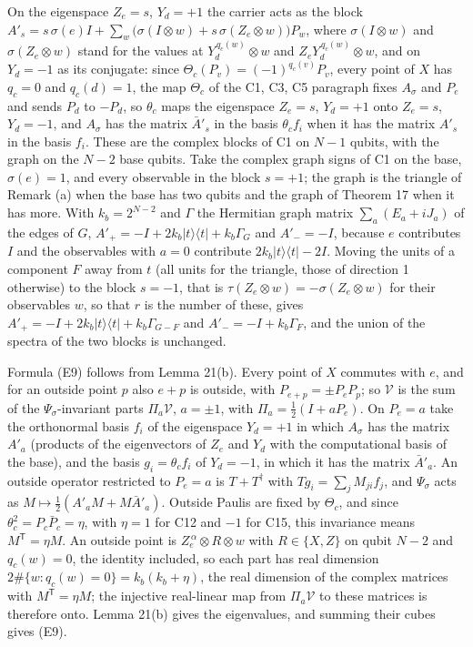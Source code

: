 \documentclass[11pt,a4paper]{article}
\begin{document}
On the eigenspace \(Z_e=s\), \(Y_d=+1\) the carrier acts as the block
\(A'_s=s\,\sigma(e)I+\sum_w\bigl(\sigma(I\otimes w)+s\,\sigma(Z_e\otimes w)\bigr)P_w\), where \(\sigma(I\otimes w)\) and
\(\sigma(Z_e\otimes w)\) stand for the values at \(Y_d^{\,q_c(w)}\otimes w\) and \(Z_eY_d^{\,q_c(w)}\otimes w\), and on
\(Y_d=-1\) as its conjugate: since \(\Theta_c(P_v)=(-1)^{q_c(v)}P_v\), every point of \(X\) has \(q_c=0\) and
\(q_c(d)=1\), the map \(\Theta_c\) of the C1, C3, C5 paragraph fixes \(A_\sigma\) and \(P_e\) and sends \(P_d\) to
\(-P_d\), so \(\theta_c\) maps the eigenspace
\(Z_e=s\), \(Y_d=+1\) onto \(Z_e=s\), \(Y_d=-1\), and \(A_\sigma\) has the matrix \(\bar A'_s\) in the basis \(\theta_cf_i\)
when it has the matrix \(A'_s\) in the basis \(f_i\). These are the complex blocks of C1 on \(N-1\) qubits,
with the graph on the \(N-2\) base qubits. Take the complex graph signs of C1 on the base,
\(\sigma(e)=1\), and every observable in the block \(s=+1\); the graph is the triangle of Remark (a) when the
base has two qubits and the graph of Theorem 17 when it has more. With \(k_b=2^{N-2}\) and \(\Gamma\) the
Hermitian graph matrix \(\sum_a(E_a+iJ_a)\) of the edges of \(G\),
\(A'_+=-I+2k_b|t\rangle\langle t|+k_b\Gamma_G\) and \(A'_-=-I\), because \(e\) contributes \(I\) and the observables
with \(a=0\) contribute \(2k_b|t\rangle\langle t|-2I\). Moving the units of a component \(F\) away from \(t\) (all
units for the triangle, those of direction 1 otherwise) to the block \(s=-1\), that is
\(\tau(Z_e\otimes w)=-\sigma(Z_e\otimes w)\) for their observables \(w\), so that \(r\) is the number of these,
gives \(A'_+=-I+2k_b|t\rangle\langle t|+k_b\Gamma_{G-F}\) and \(A'_-=-I+k_b\Gamma_F\), and the union of the
spectra of the two blocks is unchanged.

Formula (E9) follows from Lemma 21(b). Every point of \(X\) commutes with \(e\), and for an outside point
\(p\) also \(e+p\) is outside, with \(P_{e+p}=\pm P_eP_p\); so \(\mathcal V\) is the sum of the \(\Psi_\sigma\)-invariant
parts \(\Pi_a\mathcal V\), \(a=\pm1\), with \(\Pi_a=\frac12(I+aP_e)\). On \(P_e=a\) take the orthonormal basis \(f_i\) of
the eigenspace \(Y_d=+1\) in which \(A_\sigma\) has the matrix \(A'_a\) (products of the eigenvectors of \(Z_e\)
and \(Y_d\) with the computational basis of the base), and the basis \(g_i=\theta_cf_i\) of \(Y_d=-1\), in which
it has the matrix \(\bar A'_a\). An outside operator restricted to \(P_e=a\) is \(T+T^\dagger\) with
\(Tg_i=\sum_jM_{ji}f_j\), and \(\Psi_\sigma\) acts as \(M\mapsto\frac12(A'_aM+M\bar A'_a)\). Outside Paulis are
fixed by \(\Theta_c\), and since \(\theta_c^2=P_c\bar P_c=\eta\), with \(\eta=1\) for C12 and \(-1\) for C15, this
invariance means \(M^{\mathsf T}=\eta M\). An outside point is \(Z_e^{\,\alpha}\otimes R\otimes w\) with
\(R\in\{X,Z\}\) on qubit \(N-2\) and \(q_c(w)=0\), the identity included, so each part has real dimension
\(2\#\{w:q_c(w)=0\}=k_b(k_b+\eta)\), the real dimension of the complex matrices with \(M^{\mathsf T}=\eta M\);
the injective real-linear map from \(\Pi_a\mathcal V\) to these matrices is therefore onto. Lemma 21(b) gives
the eigenvalues, and summing their cubes gives (E9).
\end{document}
